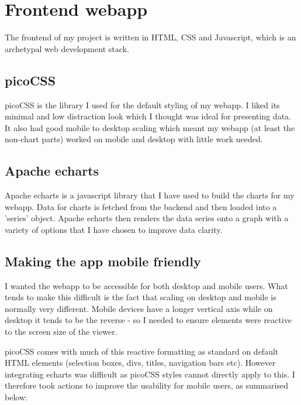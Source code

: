 \section{Frontend webapp}

The frontend of my project is written in HTML, CSS and Javascript, which is an
archetypal web development stack.

\subsection{picoCSS}

picoCSS is the library I used for the default styling of my webapp. I liked its
minimal and low distraction look which I thought was ideal for presenting data.
It also had good mobile to desktop scaling which meant my webapp (at least the
non-chart parts) worked on mobile and desktop with little work needed.

\subsection{Apache echarts}

Apache echarts is a javascript library that I have used to build the charts for
my webapp. Data for charts is fetched from the backend and then loaded into a
'series' object. Apache echarts then renders the data series onto a graph with a
variety of options that I have chosen to improve data clarity.

\subsection{Making the app mobile friendly}

I wanted the webapp to be accessible for both desktop and mobile users. What
tends to make this difficult is the fact that scaling on desktop and mobile is
normally very different. Mobile devices have a longer vertical axis while on
desktop it tends to be the reverse - so I needed to ensure elements were
reactive to the screen size of the viewer.

picoCSS comes with much of this reactive formatting as standard on default HTML
elements (selection boxes, divs, titles, navigation bars etc). However
integrating echarts was difficult as picoCSS styles cannot directly apply to
this. I therefore took actions to improve the usability for mobile users, as
summarised below:

